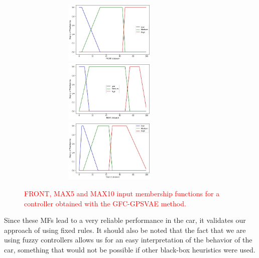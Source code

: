 \documentclass[10pt,journal,compsoc]{IEEEtran}
\begin{document}
%
\begin{figure}[h]	
  \begin{center}
    \includegraphics[width=9cm, height=3cm]{fig/FRONT.jpg}
    \includegraphics[width=9cm, height=3cm]{fig/MAX5.jpg}
    \includegraphics[width=9cm, height=3cm]{fig/MAX10.jpg}		
    \caption{\textcolor{red}{FRONT, MAX5 and MAX10 input membership functions for a controller obtained with the {\sf GFC-GPSVAE} method.}}
    \label{fig:frontmfs}
\end{center}	
\end{figure}
%

Since these MFs lead to a very reliable performance in the car, it
validates our approach of using fixed rules. It should
also be noted that the fact that we are using fuzzy controllers allows
us for an easy interpretation of the behavior of the car, something
that would not be possible if other black-box heuristics were used.
\end{document}
